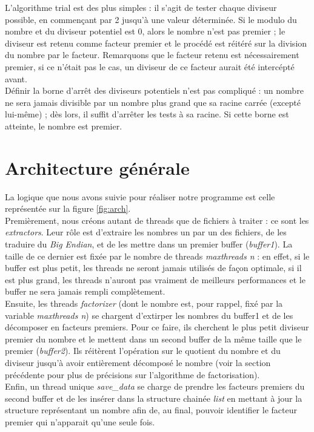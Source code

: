 \documentclass{article}
\begin{document}
L'algorithme trial est des plus simples : il s'agit de tester chaque diviseur possible, en commençant
par 2 jusqu'à une valeur déterminée. Si le modulo du nombre et du diviseur potentiel est 0, alors 
le nombre n'est pas premier ; le diviseur est retenu comme facteur premier et le procédé est réitéré
sur la division du nombre par le facteur. Remarquons que le facteur retenu est nécessairement premier,
si ce n'était pas le cas, un diviseur de ce facteur aurait été intercépté avant.\\

Définir la borne d'arrêt des diviseurs potentiels n'est pas compliqué : un nombre ne sera jamais 
divisible par un nombre plus grand que sa racine carrée (excepté lui-même) ; dès lors, il suffit
d'arrêter les tests à sa racine. Si cette borne est atteinte, le nombre est premier.

\section{Architecture générale}
La logique que nous avons suivie pour réaliser notre programme est celle représentée sur la figure \ref{fig:arch}. \\
Premièrement, nous créons autant de threads que de fichiers à traiter : ce sont les \emph{extractors}. 
Leur rôle est d'extraire les nombres un par un des fichiers, de les traduire du \emph{Big Endian}, et de les
mettre dans un premier buffer (\emph{buffer1}). La taille de ce dernier est fixée par le nombre de threads 
\emph{maxthreads n} : en effet, si le buffer est plus petit, les threads ne seront jamais utilisés de façon
optimale, si il est plus grand, les threads n'auront pas vraiment de meilleurs performances et le buffer ne
sera jamais rempli complètement. \\
Ensuite, les threads \emph{factorizer} (dont le nombre est, pour rappel, fixé par la variable \emph{maxthreads n}) se chargent d'extirper les nombres du buffer1 et de les décomposer en facteurs premiers. Pour ce faire, ils cherchent le plus petit diviseur premier du nombre et le mettent dans un second buffer de la même taille que le premier (\emph{buffer2}). Ils réitèrent l'opération sur le quotient du nombre et du diviseur jusqu'à avoir entièrement décomposé le nombre (voir la section précédente pour plus de précisions sur l'algorithme de factorisation).\\
Enfin, un thread unique \emph{save\_data} se charge de prendre les facteurs premiers du second buffer et de les insérer dans la structure chainée \emph{list} en mettant à jour la structure représentant un nombre afin de, au final, pouvoir identifier le facteur premier qui n'apparait qu'une seule fois.\\
\end{document}
